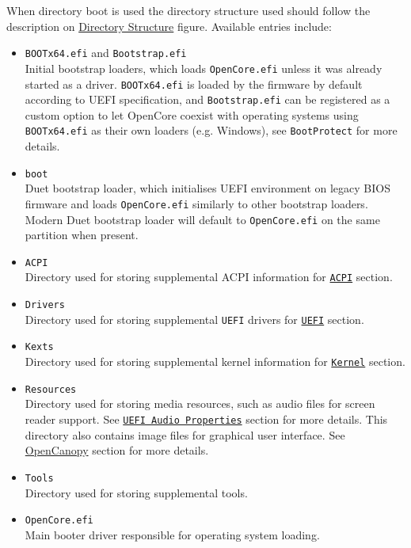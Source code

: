 \documentclass[]{article}
\providecommand{\tightlist}{%
  \setlength{\itemsep}{0pt}\setlength{\parskip}{0pt}}
\begin{document}
When directory boot is used the directory structure used should follow
the description on \hyperref[fig:DS]{Directory Structure} figure. Available
entries include:

\begin{itemize}
\tightlist
\item
  \texttt{BOOTx64.efi} and \texttt{Bootstrap.efi} \\
  Initial bootstrap loaders, which loads \texttt{OpenCore.efi} unless it was
  already started as a driver. \texttt{BOOTx64.efi} is loaded by the firmware
  by default according to UEFI specification, and \texttt{Bootstrap.efi} can
  be registered as a custom option to let OpenCore coexist with operating systems
  using \texttt{BOOTx64.efi} as their own loaders (e.g. Windows), see
  \texttt{BootProtect} for more details.
\item
  \texttt{boot} \\
  Duet bootstrap loader, which initialises UEFI environment on legacy BIOS firmware
  and loads \texttt{OpenCore.efi} similarly to other bootstrap loaders. Modern Duet
  bootstrap loader will default to \texttt{OpenCore.efi} on the same partition when
  present.
\item
  \texttt{ACPI} \\
  Directory used for storing supplemental ACPI information
  for \hyperref[acpi]{\texttt{ACPI}} section.
\item
  \texttt{Drivers} \\
  Directory used for storing supplemental \texttt{UEFI}
  drivers for \hyperref[uefi]{\texttt{UEFI}} section.
\item
  \texttt{Kexts} \\
  Directory used for storing supplemental kernel information
  for \hyperref[kernel]{\texttt{Kernel}} section.
\item
  \texttt{Resources} \\
  Directory used for storing media resources, such as audio files
  for screen reader support. See \hyperref[uefiaudioprops]{\texttt{UEFI Audio Properties}}
  section for more details. This directory also contains image files
  for graphical user interface. See \hyperref[ueficanopy]{OpenCanopy} section for more details.
\item
  \texttt{Tools} \\
  Directory used for storing supplemental tools.
\item
  \texttt{OpenCore.efi} \\
  Main booter driver responsible for operating system loading.

\end{itemize}
\end{document}
